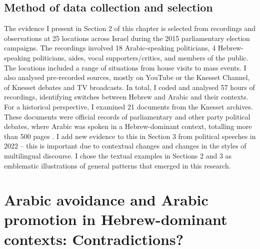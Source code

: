 \documentclass[output=paper,arabicfont]{langscibook}
\begin{document}
\subsection{Method of data collection and selection}
\largerpage
The evidence I present in Section 2 of this chapter is selected from recordings and observations at 25 locations across Israel during the 2015 parliamentary election campaigns. The recordings involved 18 Arabic-speaking politicians, 4 Hebrew-speaking politicians, aides, vocal supporters/critics, and members of the public. The locations included a range of situations from house visits to mass events. I also analysed pre-recorded sources, mostly on YouTube or the Knesset Channel, of Knesset debates and TV broadcasts. In total, I coded and analysed 57 hours of recordings, identifying switches between Hebrew and Arabic and their contexts. For a historical perspective, I examined 21 documents from the Knesset archives. These documents were official records of parliamentary and other party political debates, where Arabic was spoken in a Hebrew-dominant context, totalling more than 500 pages \citep{hawker2019a}. I add new evidence to this in Section 3 from political speeches in 2022 – this is important due to contextual changes and changes in the styles of multilingual discourse. I chose the textual examples in Sections 2 and 3 as emblematic illustrations of general patterns that emerged in this research.

\section{Arabic avoidance and Arabic promotion in Hebrew-dominant contexts: Contradictions?}
\end{document}
